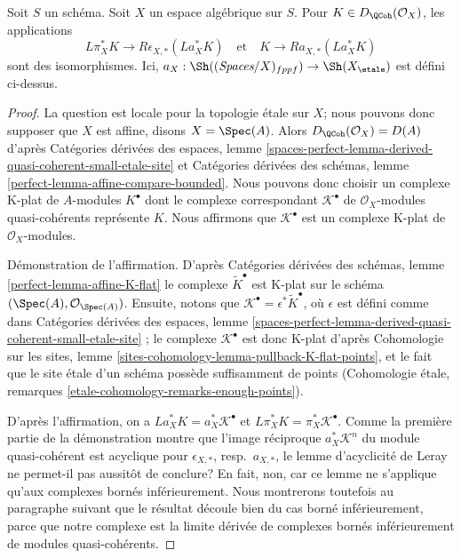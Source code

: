 \begin{lemma}
\label{lemma-cohomological-descent-etale-fppf-modules-unbounded}
Soit $S$ un schéma. Soit $X$ un espace algébrique sur $S$.
Pour $K \in D_\QCoh(\mathcal{O}_X)$, les applications
$$
L\pi_X^*K \longrightarrow R\epsilon_{X, *}(La_X^*K)
\quad\text{et}\quad
K \longrightarrow Ra_{X, *}(La_X^*K)
$$
sont des isomorphismes. Ici,
$a_X : \Sh((\textit{Spaces}/X)_{fppf}) \to \Sh(X_\etale)$ est défini ci-dessus.
\end{lemma}

\begin{proof}
La question est locale pour la topologie étale sur $X$; nous pouvons donc
supposer que $X$ est affine, disons $X = \Spec(A)$. Alors
$D_\QCoh(\mathcal{O}_X) = D(A)$ d'après Catégories dérivées des espaces, lemme
\ref{spaces-perfect-lemma-derived-quasi-coherent-small-etale-site}
et Catégories dérivées des schémas, lemme
\ref{perfect-lemma-affine-compare-bounded}.
Nous pouvons donc choisir un complexe K-plat de $A$-modules $K^\bullet$ dont
le complexe correspondant $\mathcal{K}^\bullet$ de $\mathcal{O}_X$-modules
quasi-cohérents représente $K$.
Nous affirmons que $\mathcal{K}^\bullet$ est un complexe K-plat de
$\mathcal{O}_X$-modules.

\medskip\noindent
Démonstration de l'affirmation. D'après Catégories dérivées des schémas, lemme
\ref{perfect-lemma-affine-K-flat}
le complexe $\widetilde{K}^\bullet$ est K-plat sur le schéma
$(\Spec(A), \mathcal{O}_{\Spec(A)})$.
Ensuite, notons que $\mathcal{K}^\bullet = \epsilon^*\widetilde{K}^\bullet$,
où $\epsilon$ est défini comme dans Catégories dérivées des espaces, lemme
\ref{spaces-perfect-lemma-derived-quasi-coherent-small-etale-site}
; le complexe $\mathcal{K}^\bullet$ est donc K-plat d'après Cohomologie sur les
sites, lemme \ref{sites-cohomology-lemma-pullback-K-flat-points}, et le fait que
le site étale d'un schéma possède suffisamment de points (Cohomologie étale,
remarques \ref{etale-cohomology-remarks-enough-points}).

\medskip\noindent
D'après l'affirmation, on a
$La_X^*K = a_X^*\mathcal{K}^\bullet$ et
$L\pi_X^*K = \pi_X^*\mathcal{K}^\bullet$.
Comme la première partie de la démonstration montre que l'image réciproque
$a_X^*\mathcal{K}^n$ du module quasi-cohérent est acyclique pour
$\epsilon_{X, *}$, resp.\ $a_{X, *}$, le lemme d'acyclicité de Leray ne
permet-il pas aussitôt de conclure? En fait, non, car ce lemme ne s'applique
qu'aux complexes bornés inférieurement. Nous montrerons toutefois au paragraphe
suivant que le résultat découle bien du cas borné inférieurement, parce que
notre complexe est la limite dérivée de complexes bornés inférieurement de
modules quasi-cohérents.


\end{proof}
